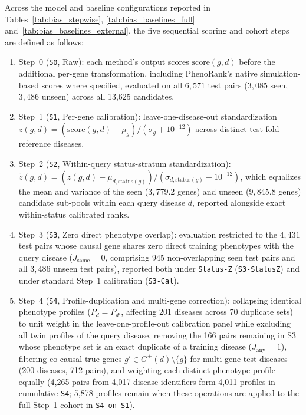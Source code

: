 \documentclass{article}
\begin{document}
Across the model and baseline configurations reported in
Tables~\ref{tab:bias_stepwise}, \ref{tab:bias_baselines_full} and~\ref{tab:bias_baselines_external}, the five sequential
scoring and cohort steps are defined as follows:
\begin{enumerate}
\item Step~0 (\texttt{S0}, Raw): each method's output scores $\mathrm{score}(g,d)$
  before the additional per-gene transformation, including PhenoRank's native
  simulation-based scores where specified,
  evaluated on all $6{,}571$ test pairs ($3{,}085$ seen, $3{,}486$ unseen) across
  all 13{,}625 candidates.
\item Step~1 (\texttt{S1}, Per-gene calibration): leave-one-disease-out
  standardization $z(g,d) = (\mathrm{score}(g,d) - \mu_g)/(\sigma_g + 10^{-12})$
  across distinct test-fold reference diseases.
\item Step~2 (\texttt{S2}, Within-query status-stratum standardization):
  $\tilde{z}(g,d) = (z(g,d) - \mu_{d,\mathrm{status}(g)})/(\sigma_{d,\mathrm{status}(g)} + 10^{-12})$,
  which equalizes the mean and variance of the seen ($3{,}779.2$ genes) and
  unseen ($9{,}845.8$ genes) candidate sub-pools within each query disease $d$,
  reported alongside exact within-status calibrated ranks.
\item Step~3 (\texttt{S3}, Zero direct phenotype overlap): evaluation restricted
  to the $4{,}431$ test pairs whose causal gene shares zero direct training
  phenotypes with the query disease ($J_{\mathrm{same}}=0$, comprising $945$
  non-overlapping seen test pairs and all $3{,}486$ unseen test pairs), reported
  both under \texttt{Status-Z} (\texttt{S3-StatusZ}) and under standard Step~1
  calibration (\texttt{S3-Cal}).
\item Step~4 (\texttt{S4}, Profile-duplication and multi-gene correction):
  collapsing identical phenotype profiles ($P_d = P_{d'}$, affecting 201 diseases
  across 70 duplicate sets) to unit weight in the leave-one-profile-out
  calibration panel while excluding all twin profiles of the query disease,
  removing the 166 pairs remaining in S3 whose phenotype set is an exact duplicate of a
  training disease ($J_{\mathrm{any}}=1$), filtering co-causal true genes
  $g' \in G^{+}(d)\setminus\{g\}$ for multi-gene test diseases (200 diseases, 712
  pairs), and weighting each distinct phenotype profile equally (4{,}265 pairs
  from 4{,}017 disease identifiers form 4{,}011 profiles in cumulative
  \texttt{S4}; 5{,}878 profiles remain when these operations are applied
  to the full Step~1 cohort in
  \texttt{S4-on-S1}).
\end{enumerate}
\end{document}
